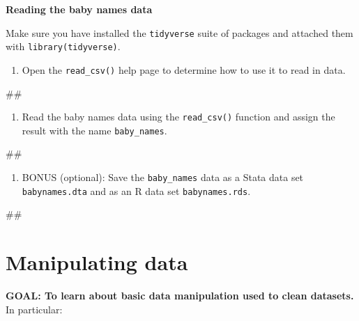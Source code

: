 \documentclass[]{book}
\newenvironment{Shaded}{\begin{snugshade}}{\end{snugshade}}
\newcommand{\NormalTok}[1]{#1}
\providecommand{\tightlist}{%
  \setlength{\itemsep}{0pt}\setlength{\parskip}{0pt}}
\begin{document}
\textbf{Reading the baby names data}

Make sure you have installed the \texttt{tidyverse} suite of packages
and attached them with \texttt{library(tidyverse)}.

\begin{enumerate}
\def\labelenumi{\arabic{enumi}.}
\tightlist
\item
  Open the \texttt{read\_csv()} help page to determine how to use it to
  read in data.
\end{enumerate}

\begin{Shaded}
\begin{Highlighting}[]
\NormalTok{##}
\end{Highlighting}
\end{Shaded}

\begin{enumerate}
\def\labelenumi{\arabic{enumi}.}
\setcounter{enumi}{1}
\tightlist
\item
  Read the baby names data using the \texttt{read\_csv()} function and
  assign the result with the name \texttt{baby\_names}.
\end{enumerate}

\begin{Shaded}
\begin{Highlighting}[]
\NormalTok{##}
\end{Highlighting}
\end{Shaded}

\begin{enumerate}
\def\labelenumi{\arabic{enumi}.}
\setcounter{enumi}{2}
\tightlist
\item
  BONUS (optional): Save the \texttt{baby\_names} data as a Stata data
  set \texttt{babynames.dta} and as an R data set
  \texttt{babynames.rds}.
\end{enumerate}

\begin{Shaded}
\begin{Highlighting}[]
\NormalTok{##}
\end{Highlighting}
\end{Shaded}

\section{Manipulating data}\label{manipulating-data}

\textbf{GOAL: To learn about basic data manipulation used to clean
datasets.} In particular:
\end{document}
